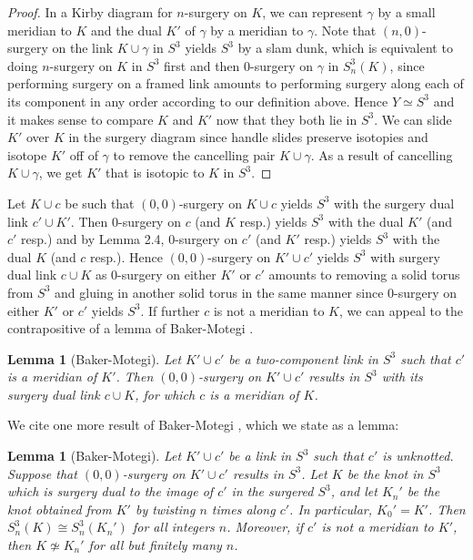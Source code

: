 \documentclass[11pt,usenames,dvipsnames,reqno]{amsart}
\numberwithin{theorem}{section}
\newtheorem{lemma}[theorem]{Lemma}
\theoremstyle{ex}
\theoremstyle{rem}
\begin{document}
\begin{proof}
	In a Kirby diagram for $n$-surgery on $K$, we can represent $\gamma$ by a small meridian to $K$ and the dual $K'$ of $\gamma$ by a meridian to $\gamma$. Note that $(n, 0)$-surgery on the link $K \cup \gamma$ in $S^3$ yields $S^3$ by a slam dunk, which is equivalent to doing $n$-surgery on $K$ in $S^3$ first and then $0$-surgery on $\gamma$ in $S^3_n(K)$, since performing surgery on a framed link amounts to performing surgery along each of its component in any order according to our definition above. Hence $Y \simeq S^3$ and it makes sense to compare $K$ and $K'$ now that they both lie in $S^3$. We can slide $K'$ over $K$ in the surgery diagram since handle slides preserve isotopies and isotope $K'$ off of $\gamma$ to remove the cancelling pair $K\cup \gamma$. As a result of cancelling $K\cup \gamma$, we get $K'$ that is isotopic to $K$ in $S^3$. 
\end{proof}

Let $K \cup c$ be such that $(0, 0)$-surgery on $K \cup c$ yields $S^3$ with the surgery dual link $c' \cup K'$. Then $0$-surgery on $c$ (and $K$ resp.) yields $S^3$ with the dual $K'$ (and $c'$ resp.) and by Lemma 2.4, $0$-surgery on $c'$ (and $K'$ resp.) yields $S^3$ with the dual $K$ (and $c$ resp.). Hence $(0, 0)$-surgery on $K' \cup c'$ yields $S^3$ with surgery dual link $c \cup K$ as $0$-surgery on either $K'$ or $c'$ amounts to removing a solid torus from $S^3$ and gluing in another solid torus in the same manner since $0$-surgery on either $K'$ or $c'$ yields $S^3$. If further $c$ is not a meridian to $K$, we can appeal to the contrapositive of a lemma of Baker-Motegi \cite[Lemma 2.4]{baker-motegi}. 

\begin{lemma}[Baker-Motegi]
	Let $K'\cup c'$ be a two-component link in $S^3$ such that $c'$ is a meridian of $K'$. Then $(0,0)$-surgery on $K'\cup c'$ results in $S^3$ with its surgery dual link $c\cup K$, for which $c$ is a meridian of $K$.
\end{lemma}
	
We cite one more result of Baker-Motegi \cite[Theorem 2.1]{baker-motegi}, which we state as a lemma:

\begin{lemma}[Baker-Motegi]
	Let $K'\cup c'$ be a link in $S^3$ such that $c'$ is unknotted. Suppose that $(0,0)$-surgery on $K'\cup c'$ results in $S^3$. Let $K$ be the knot in $S^3$ which is surgery dual to the image of $c'$ in the surgered $S^3$, and let $K_n'$ be the knot obtained from $K'$ by twisting $n$ times along $c'$. In particular, $K_0'=K'$. Then $S^3_n(K)\cong S^3_n(K_n')$ for all integers $n$. Moreover, if $c'$ is not a meridian to $K'$, then $K\not\simeq K_n'$ for all but finitely many $n$.
\end{lemma}
\end{document}
